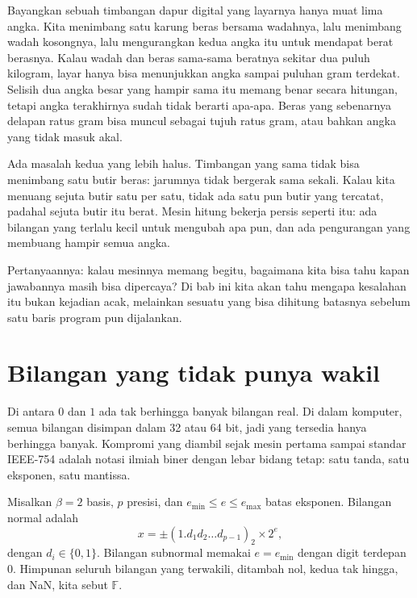 \begin{untukanak}
Bayangkan sebuah timbangan dapur digital yang layarnya hanya muat lima angka. Kita
menimbang satu karung beras bersama wadahnya, lalu menimbang wadah kosongnya, lalu
mengurangkan kedua angka itu untuk mendapat berat berasnya. Kalau wadah dan beras
sama-sama beratnya sekitar dua puluh kilogram, layar hanya bisa menunjukkan angka
sampai puluhan gram terdekat. Selisih dua angka besar yang hampir sama itu memang
benar secara hitungan, tetapi angka terakhirnya sudah tidak berarti apa-apa. Beras
yang sebenarnya delapan ratus gram bisa muncul sebagai tujuh ratus gram, atau bahkan
angka yang tidak masuk akal.

Ada masalah kedua yang lebih halus. Timbangan yang sama tidak bisa menimbang satu
butir beras: jarumnya tidak bergerak sama sekali. Kalau kita menuang sejuta butir satu
per satu, tidak ada satu pun butir yang tercatat, padahal sejuta butir itu berat.
Mesin hitung bekerja persis seperti itu: ada bilangan yang terlalu kecil untuk
mengubah apa pun, dan ada pengurangan yang membuang hampir semua angka.

Pertanyaannya: kalau mesinnya memang begitu, bagaimana kita bisa tahu kapan jawabannya
masih bisa dipercaya? Di bab ini kita akan tahu mengapa kesalahan itu bukan kejadian
acak, melainkan sesuatu yang bisa dihitung batasnya sebelum satu baris program pun
dijalankan.
\end{untukanak}

\section{Bilangan yang tidak punya wakil}

Di antara $0$ dan $1$ ada tak berhingga banyak bilangan real. Di dalam komputer, semua
bilangan disimpan dalam 32 atau 64 bit, jadi yang tersedia hanya berhingga banyak.
Kompromi yang diambil sejak mesin pertama sampai standar IEEE-754 adalah notasi ilmiah
biner dengan lebar bidang tetap: satu tanda, satu eksponen, satu mantissa.


\begin{definisi}
Misalkan $\beta=2$ basis, $p$ presisi, dan $e_{\min}\le e\le e_{\max}$ batas eksponen.
Bilangan normal adalah
\[
  x=\pm\left(1.d_{1}d_{2}\dots d_{p-1}\right)_{2}\times2^{e},
\]
dengan $d_{i}\in\{0,1\}$. Bilangan subnormal memakai $e=e_{\min}$ dengan digit
terdepan $0$. Himpunan seluruh
bilangan yang terwakili, ditambah nol, kedua tak hingga, dan NaN, kita sebut
$\mathbb{F}$.
\end{definisi}

